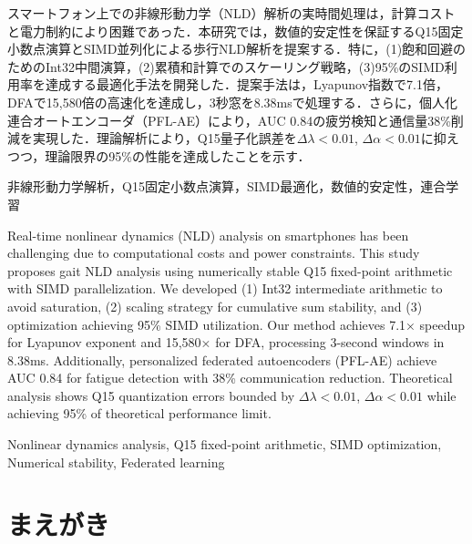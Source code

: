 \documentclass[paper]{ieice}
\begin{document}
\begin{jabstract}
スマートフォン上での非線形動力学（NLD）解析の実時間処理は，計算コストと電力制約により困難であった．本研究では，数値的安定性を保証するQ15固定小数点演算とSIMD並列化による歩行NLD解析を提案する．特に，(1)飽和回避のためのInt32中間演算，(2)累積和計算でのスケーリング戦略，(3)95\%のSIMD利用率を達成する最適化手法を開発した．提案手法は，Lyapunov指数で7.1倍，DFAで15,580倍の高速化を達成し，3秒窓を8.38msで処理する．さらに，個人化連合オートエンコーダ（PFL-AE）により，AUC 0.84の疲労検知と通信量38\%削減を実現した．理論解析により，Q15量子化誤差を$\Delta\lambda < 0.01$, $\Delta\alpha < 0.01$に抑えつつ，理論限界の95\%の性能を達成したことを示す．
\end{jabstract}

\begin{jkeyword}
非線形動力学解析，Q15固定小数点演算，SIMD最適化，数値的安定性，連合学習
\end{jkeyword}

\begin{eabstract}
Real-time nonlinear dynamics (NLD) analysis on smartphones has been challenging due to computational costs and power constraints. This study proposes gait NLD analysis using numerically stable Q15 fixed-point arithmetic with SIMD parallelization. We developed (1) Int32 intermediate arithmetic to avoid saturation, (2) scaling strategy for cumulative sum stability, and (3) optimization achieving 95\% SIMD utilization. Our method achieves 7.1× speedup for Lyapunov exponent and 15,580× for DFA, processing 3-second windows in 8.38ms. Additionally, personalized federated autoencoders (PFL-AE) achieve AUC 0.84 for fatigue detection with 38\% communication reduction. Theoretical analysis shows Q15 quantization errors bounded by $\Delta\lambda < 0.01$, $\Delta\alpha < 0.01$ while achieving 95\% of theoretical performance limit.
\end{eabstract}

\begin{ekeyword}
Nonlinear dynamics analysis, Q15 fixed-point arithmetic, SIMD optimization, Numerical stability, Federated learning
\end{ekeyword}

\maketitle

\section{まえがき}
\end{document}
